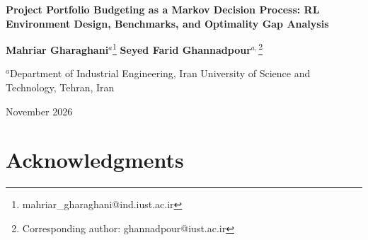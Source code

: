 \documentclass[11pt,a4paper]{article}
\begin{document}
\thispagestyle{empty}


\begin{center}

  {\Large\bfseries Project Portfolio Budgeting as a Markov Decision
  Process: RL Environment Design, Benchmarks, and Optimality Gap
  Analysis}

  \vspace{1.5em}


  {\large
    \textbf{Mahriar Gharaghani}$^{a}$\footnote{mahriar\_gharaghani@ind.iust.ac.ir}
    \quad
    \textbf{Seyed Farid Ghannadpour}$^{a,}$\footnote{Corresponding
    author: ghannadpour@iust.ac.ir}
  }

  \vspace{0.8em}


  {\normalsize
    $^{a}$Department of Industrial Engineering,
    Iran University of Science and Technology,
    Tehran, Iran
  }

  \vspace{0.5em}

  {\normalsize November 2026}

\end{center}

\vspace{2em}


\section*{Acknowledgments}


\vspace{2em}

\end{document}
